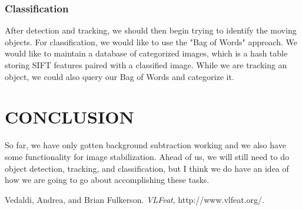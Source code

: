 \documentclass[a4paper, 10pt, conference]{ieeeconf}      %
\begin{document}
\subsubsection{Classification}
After detection and tracking, we should then begin trying to identify the moving objects. For classification, we would like to use the "Bag of Words" approach. We would like to maintain a database of categorized images, which is a hash table storing SIFT features paired with a classified image. While we are tracking an object, we could also query our Bag of Words and categorize it.



\section{CONCLUSION}
So far, we have only gotten background subtraction working and we also have some functionality for image stabilization. Ahead of us, we will still need to do object detection, tracking, and classification, but I think we do have an idea of how we are going to go about accomplishing these tasks. 













\begin{thebibliography}{99}

Vedaldi, Andrea, and Brian Fulkerson. {\it VLFeat}, http://www.vlfeat.org/.



\end{thebibliography}
\end{document}
